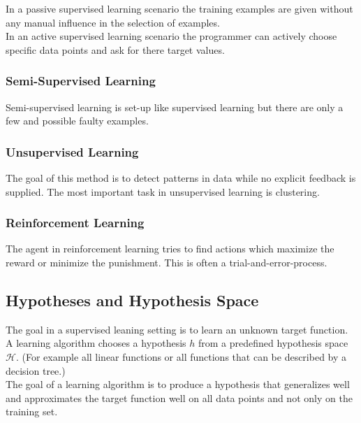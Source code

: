 \documentclass[english]{panikzettel}
\begin{document}
In a passive supervised learning scenario the training examples are given without any manual influence in the selection of examples.\\
In an active supervised learning scenario the programmer can actively choose specific data points and ask for there target values.

%


\subsubsection{Semi-Supervised Learning}
Semi-supervised learning is set-up like supervised learning but there are only a few and possible faulty examples.

\subsubsection{Unsupervised Learning}
The goal of this method is to detect patterns in data while no explicit feedback is supplied. The most important task in unsupervised learning is clustering.

\subsubsection{Reinforcement Learning}
The agent in reinforcement learning tries to find actions which maximize the reward or minimize the punishment. This is often a trial-and-error-process.


\subsection{Hypotheses and Hypothesis Space}
The goal in a supervised leaning setting is to learn an unknown target function. A learning algorithm chooses a hypothesis $h$ from a predefined hypothesis space $\mathcal{H}$. (For example all linear functions or all functions that can be described by a decision tree.)\\
The goal of a learning algorithm is to produce a hypothesis that generalizes well and approximates the target function well on all data points and not only on the training set.
\end{document}

